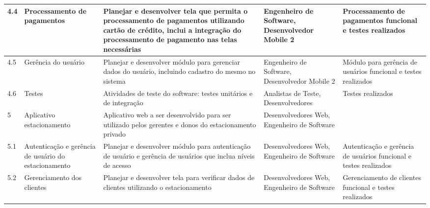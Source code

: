 \begin{landscape}
\begin{longtable}{@{\extracolsep{\fill}}  l  p{}  p{}  p{}  p{}  }
		\midrule
		4.4         & Processamento de pagamentos                              & Planejar e desenvolver tela que permita o processamento de pagamentos utilizando cartão de crédito, inclui a integração do processamento de pagamento nas telas necessárias & Engenheiro de Software, Desenvolvedor Mobile 2                                                   & Processamento de pagamentos funcional e testes realizados                                                \\*
		\midrule
		4.5         & Gerência do usuário                                    & Planejar e desenvolver módulo para gerenciar dados do usuário, incluindo cadastro do mesmo no sistema                                                                          & Engenheiro de Software, Desenvolvedor Mobile 2                                                   & Módulo para gerência de usuários funcional e testes realizados                                        \\*
		\midrule
		4.6         & Testes                                                   & Atividades de teste do software: testes unitários e de integração                                                                                                             & Analistas de Teste, Desenvolvedores                                                              & Testes realizados                                                                                        \\*
		\midrule
		5           & Aplicativo estacionamento                                & Aplicativo web a ser desenvolvido para ser utilizado pelos gerentes e donos do estacionamento privado                                                                            & Desenvolvedores Web, Engenheiro de Software                                                      &                                                                                                          \\*
		\midrule
		5.1         & Autenticação e gerência de usuário do estacionamento & Planejar e desenvolver módulo para autenticação de usuário e gerência de usuários que inclua níveis de acesso                                                             & Desenvolvedores Web, Engenheiro de Software                                                      & Autenticação e gerência de usuários funcional e testes realizados                                    \\*
		\midrule
		5.2         & Gerenciamento dos clientes                               & Planejar e desenvolver tela para verificar dados de clientes utilizando o estacionamento                                                                                         & Desenvolvedores Web, Engenheiro de Software                                                      & Gerenciamento de clientes funcional e testes realizados                                                  \\*

\end{longtable}
\end{landscape}
